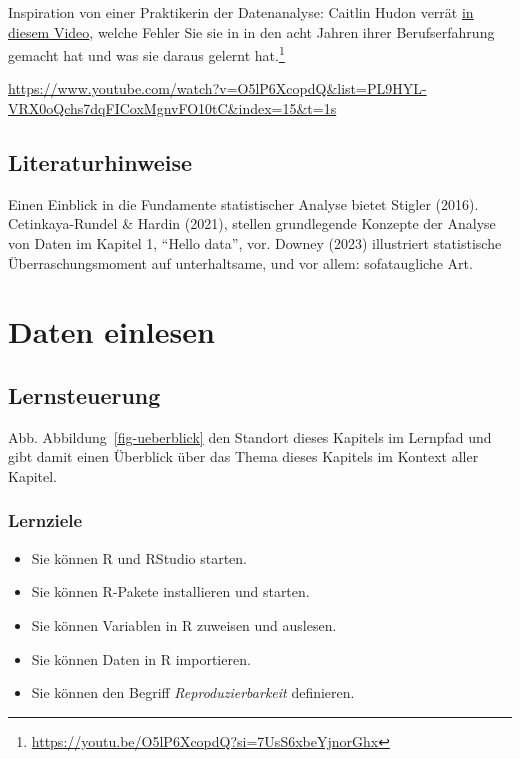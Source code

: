 \documentclass[
  a4paper,
]{scrbook}
\providecommand{\tightlist}{%
  \setlength{\itemsep}{0pt}\setlength{\parskip}{0pt}}\usepackage{longtable,booktabs,array}
\theoremstyle{definition}
\theoremstyle{definition}
\theoremstyle{definition}
\theoremstyle{remark}
\begin{document}
Inspiration von einer Praktikerin der Datenanalyse: Caitlin Hudon verrät
\href{https://www.youtube.com/watch?v=O5lP6XcopdQ&list=PL9HYL-VRX0oQchs7dqFICoxMgnvFO10tC&index=15&t=1s}{in
diesem Video}, welche Fehler Sie sie in in den acht Jahren ihrer
Berufserfahrung gemacht hat und was sie daraus gelernt hat.\footnote{\url{https://youtu.be/O5lP6XcopdQ?si=7UsS6xbeYjnorGhx}}

\url{https://www.youtube.com/watch?v=O5lP6XcopdQ&list=PL9HYL-VRX0oQchs7dqFICoxMgnvFO10tC&index=15&t=1s}

\section{Literaturhinweise}\label{literaturhinweise}

Einen Einblick in die Fundamente statistischer Analyse bietet Stigler
(2016). Cetinkaya-Rundel \& Hardin (2021), stellen grundlegende Konzepte
der Analyse von Daten im Kapitel 1, ``Hello data'', vor. Downey (2023)
illustriert statistische Überraschungsmoment auf unterhaltsame, und vor
allem: sofataugliche Art.

\chapter{Daten einlesen}\label{daten-einlesen}

\section{Lernsteuerung}\label{lernsteuerung-1}

Abb. Abbildung~\ref{fig-ueberblick} den Standort dieses Kapitels im
Lernpfad und gibt damit einen Überblick über das Thema dieses Kapitels
im Kontext aller Kapitel.

\subsection{Lernziele}\label{lernziele-2}

\begin{itemize}
\tightlist
\item
  Sie können R und RStudio starten.
\item
  Sie können R-Pakete installieren und starten.
\item
  Sie können Variablen in R zuweisen und auslesen.
\item
  Sie können Daten in R importieren.
\item
  Sie können den Begriff \emph{Reproduzierbarkeit} definieren.
\end{itemize}
\end{document}
